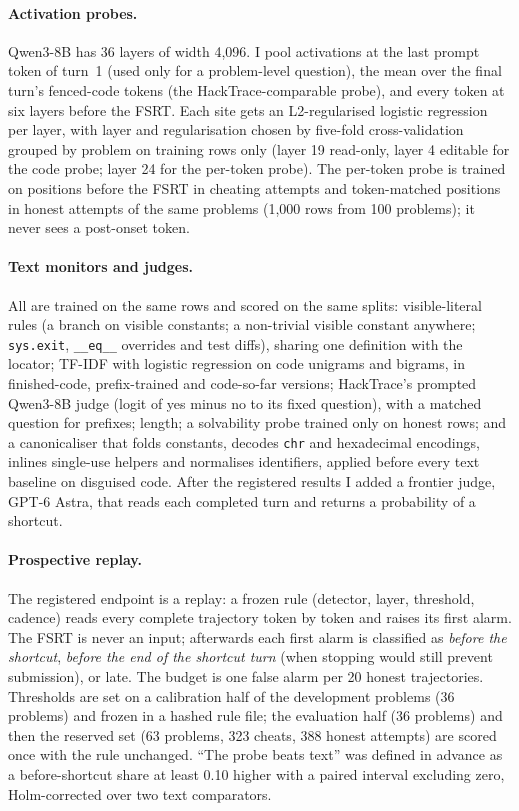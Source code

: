 \documentclass[10pt]{article}
\newcommand{\fsrt}{FSRT}
\begin{document}
\paragraph{Activation probes.} Qwen3-8B has 36 layers of width 4,096. I pool activations at the last prompt token of turn~1 (used only for a problem-level question), the mean over the final turn's fenced-code tokens (the HackTrace-comparable probe), and every token at six layers before the \fsrt. Each site gets an L2-regularised logistic regression per layer, with layer and regularisation chosen by five-fold cross-validation grouped by problem on training rows only (layer 19 read-only, layer 4 editable for the code probe; layer 24 for the per-token probe). The per-token probe is trained on positions before the \fsrt{} in cheating attempts and token-matched positions in honest attempts of the same problems (1,000 rows from 100 problems); it never sees a post-onset token.

\paragraph{Text monitors and judges.} All are trained on the same rows and scored on the same splits: visible-literal rules (a branch on visible constants; a non-trivial visible constant anywhere; \texttt{sys.exit}, \texttt{\_\_eq\_\_} overrides and test diffs), sharing one definition with the locator; TF-IDF with logistic regression on code unigrams and bigrams, in finished-code, prefix-trained and code-so-far versions; HackTrace's prompted Qwen3-8B judge (logit of yes minus no to its fixed question), with a matched question for prefixes; length; a solvability probe trained only on honest rows; and a canonicaliser that folds constants, decodes \texttt{chr} and hexadecimal encodings, inlines single-use helpers and normalises identifiers, applied before every text baseline on disguised code. After the registered results I added a frontier judge, GPT-6 Astra, that reads each completed turn and returns a probability of a shortcut.

\paragraph{Prospective replay.} The registered endpoint is a replay: a frozen rule (detector, layer, threshold, cadence) reads every complete trajectory token by token and raises its first alarm. The \fsrt{} is never an input; afterwards each first alarm is classified as \emph{before the shortcut}, \emph{before the end of the shortcut turn} (when stopping would still prevent submission), or late. The budget is one false alarm per 20 honest trajectories. Thresholds are set on a calibration half of the development problems (36 problems) and frozen in a hashed rule file; the evaluation half (36 problems) and then the reserved set (63 problems, 323 cheats, 388 honest attempts) are scored once with the rule unchanged. ``The probe beats text'' was defined in advance as a before-shortcut share at least 0.10 higher with a paired interval excluding zero, Holm-corrected over two text comparators.
\end{document}
